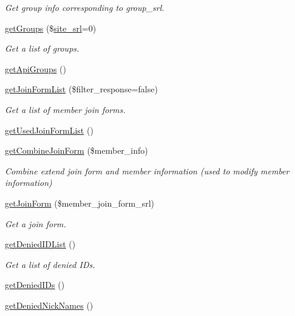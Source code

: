 \begin{DoxyCompactItemize}
\begin{DoxyCompactList}\small\item\em Get group info corresponding to group\+\_\+srl. \end{DoxyCompactList}\item 
\hyperlink{classmemberModel_a79bd0adae2d71115335afae1fc8f4e32}{get\+Groups} (\$\hyperlink{ko_8install_8php_a8b1406b4ad1048041558dce6bfe89004}{site\+\_\+srl}=0)
\begin{DoxyCompactList}\small\item\em Get a list of groups. \end{DoxyCompactList}\item 
\hyperlink{classmemberModel_a7b52f35158a9d2dc8138359fcf120b88}{get\+Api\+Groups} ()
\item 
\hyperlink{classmemberModel_af8d32c782e4637661e9379acb8ee96b1}{get\+Join\+Form\+List} (\$filter\+\_\+response=false)
\begin{DoxyCompactList}\small\item\em Get a list of member join forms. \end{DoxyCompactList}\item 
\hyperlink{classmemberModel_ab249b6e54c0b7d472d3cd50ad3b658dc}{get\+Used\+Join\+Form\+List} ()
\item 
\hyperlink{classmemberModel_a0bb14a9030332a0ab996bf545ff77de6}{get\+Combine\+Join\+Form} (\$member\+\_\+info)
\begin{DoxyCompactList}\small\item\em Combine extend join form and member information (used to modify member information) \end{DoxyCompactList}\item 
\hyperlink{classmemberModel_ad4ecb6428f8ccea4369bb7535464570e}{get\+Join\+Form} (\$member\+\_\+join\+\_\+form\+\_\+srl)
\begin{DoxyCompactList}\small\item\em Get a join form. \end{DoxyCompactList}\item 
\hyperlink{classmemberModel_ad6bb73cc72412955c289f4f695b8d0c9}{get\+Denied\+I\+D\+List} ()
\begin{DoxyCompactList}\small\item\em Get a list of denied I\+Ds. \end{DoxyCompactList}\item 
\hyperlink{classmemberModel_af8bd4c178bbae831f02b5419bc0e02ea}{get\+Denied\+I\+Ds} ()
\item 
\hyperlink{classmemberModel_ac318ffed61009f4b2d993daee7788072}{get\+Denied\+Nick\+Names} ()

\end{DoxyCompactItemize}
